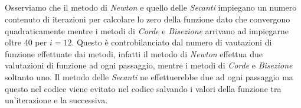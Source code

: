 \documentclass[a4paper]{report}
\begin{document}
\\ \\ \\ \\ Osserviamo che il metodo di \emph{Newton} e quello delle \emph{Secanti} impiegano un numero contenuto di iterazioni per calcolare lo zero della funzione dato che convergono quadraticamente mentre i metodi di \emph{Corde} e \emph{Bisezione} arrivano ad impiegarne oltre 40 per $i = 12$. Questo è controbilanciato dal numero di vautazioni di funzione effettuate dai metodi, infatti il metodo di \emph{Newton} effettua due valutazioni di funzione ad ogni passaggio, mentre i metodi di \emph{Corde} e \emph{Bisezione} soltanto uno. Il metodo delle \emph{Secanti} ne effettuerebbe due ad ogni passaggio ma questo nel codice  viene evitato nel codice salvando i valori della funzione tra un'iterazione e la successiva.
\\
\end{document}
